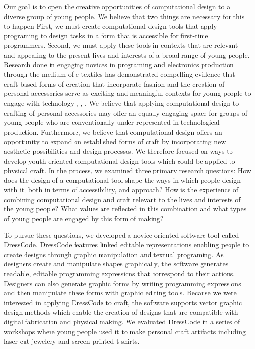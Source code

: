 \documentclass{sigchi}
\begin{document}
Our goal is to open the creative opportunities of computational design to a diverse group of young people. We believe that two things are necessary for this to happen First, we must create computational design tools that apply programing to design tasks in a form that is accessible for first-time programmers. Second, we must apply these tools in contexts that are relevant and appealing to the present lives and interests of a broad range of young people. Research done in engaging novices in programing and electronics production through the medium of e-textiles has demonstrated compelling evidence that craft-based forms of creation that incorporate fashion and the creation of personal accessories serve as exciting and meaningful contexts for young people to engage with technology \cite{buechley_wild}, \cite{kafai}, \cite{kanjun}. We believe that applying computational design to crafting of personal accessories may offer an equally engaging space for groups of young people who are conventionally under-represented in technological production. Furthermore, we believe that computational design offers an opportunity to expand on established forms of craft by incorporating new aesthetic possibilities and design processes. We therefore focused on ways to develop youth-oriented computational design tools which could be applied to physical craft. In the process, we examined three primary research questions: How does the design of a computational tool shape the ways in which people design with it, both in terms of accessibility, and approach? How is the experience of combining computational design and craft relevant to the lives and interests of the young people? What values are reflected in this combination and what types of young people are engaged by this form of making?
 
To pursue these questions, we developed a novice-oriented software tool called DressCode. DressCode features linked editable representations enabling people to create designs through graphic manipulation and textual programing. As designers create and manipulate shapes graphically, the software generates readable, editable programming expressions that correspond to their actions. Designers can also generate graphic forms by writing programming expressions and then manipulate these forms with graphic editing tools. %
Because we were interested in applying DressCode to craft, the software supports vector graphic design methods which enable the creation of designs that are compatible with digital fabrication and physical making. We evaluated DressCode in a series of workshops where young people used it to make personal craft artifacts including laser cut jewelery and screen printed t-shirts. 
\end{document}
